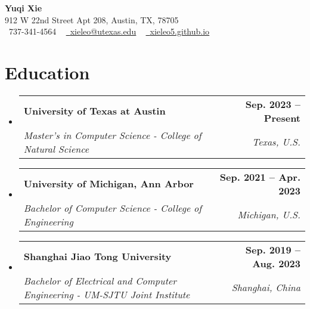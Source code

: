 \documentclass[letterpaper,11pt]{article}
\makeatletter
\newcommand{\resumeSubheading}[5]{
  \vspace{-2pt}\item
    \begin{tabular*}{1.0\textwidth}[t]{l@{\extracolsep{\fill}}r}
      \textbf{#1} \textit{#2} & \textbf{\small #3} \\
      \textit{\small#4} & \textit{\small #5} \\
    \end{tabular*}\vspace{-7pt}
}
\newcommand{\resumeSubHeadingListStart}{\begin{itemize}[leftmargin=0.0in, label={}]}
\newcommand{\resumeSubHeadingListEnd}{\end{itemize}}
\makeatother
\begin{document}

\begin{center}
    {\Large \textbf{Yuqi Xie} } \\ \vspace{1pt}
    912 W 22nd Street Apt 208, Austin, TX, 78705 \\ \vspace{1pt}
    \small \raisebox{-0.1\height}\faPhone\ 737-341-4564 ~ \href{mailto:xieleo@utexas.edu}{\raisebox{-0.2\height}\faEnvelope\  \underline{xieleo@utexas.edu}} ~ 
    \href{https://xieleo5.github.io}{\raisebox{-0.2\height}\faGithub\ \underline{xieleo5.github.io}}
    \vspace{-8pt}
\end{center}


\section{Education}
\resumeSubHeadingListStart
    \resumeSubheading
      {University of Texas at Austin}{}{Sep. 2023 -- Present}
      {Master's in Computer Science - College of Natural Science}{Texas, U.S.}
  \resumeSubHeadingListEnd
  \resumeSubHeadingListStart
    \resumeSubheading
      {University of Michigan, Ann Arbor}{}{Sep. 2021 -- Apr. 2023}
      {Bachelor of Computer Science - College of Engineering}{Michigan, U.S.}
  \resumeSubHeadingListEnd
  \resumeSubHeadingListStart
    \resumeSubheading
      {Shanghai Jiao Tong University}{}{Sep. 2019 -- Aug. 2023}
      {Bachelor of Electrical and Computer Engineering - UM-SJTU Joint Institute}{Shanghai, China}
  \resumeSubHeadingListEnd
\end{document}
